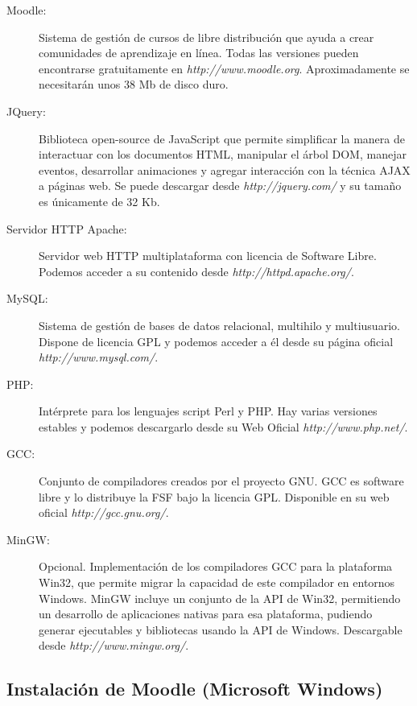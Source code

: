\begin{description}
	
	\item[Moodle:] Sistema de gestión de cursos de libre distribución que ayuda a crear comunidades de aprendizaje en línea. Todas las versiones pueden encontrarse gratuitamente en \emph{http://www.moodle.org}. Aproximadamente se necesitarán unos 38 Mb de disco duro.
	
	\item[JQuery:] Biblioteca open-source de JavaScript que permite simplificar la manera de interactuar con los documentos HTML, manipular el árbol DOM, manejar eventos, desarrollar animaciones y agregar interacción con la técnica AJAX a páginas web. Se puede descargar desde \emph{http://jquery.com/} y su tamaño es únicamente de 32 Kb.
	
	\item[Servidor HTTP Apache:] Servidor web HTTP multiplataforma con licencia de Software Libre. Podemos acceder a su contenido desde \emph{http://httpd.apache.org/}.
	
	\item[MySQL:] Sistema de gestión de bases de datos relacional, multihilo y multiusuario. Dispone de licencia GPL y podemos acceder a él desde su página oficial \emph{http://www.mysql.com/}.
	
	\item[PHP:] Intérprete para los lenguajes script Perl y PHP. Hay varias versiones estables y podemos descargarlo desde su Web Oficial \emph{http://www.php.net/}.
	
	\item[GCC:] Conjunto de compiladores creados por el proyecto GNU. GCC es software libre y lo distribuye la FSF bajo la licencia GPL. Disponible en su web oficial \emph{http://gcc.gnu.org/}.
	
	\item[MinGW:] Opcional. Implementación de los compiladores GCC para la plataforma Win32, que permite migrar la capacidad de este compilador en entornos Windows. MinGW incluye un conjunto de la API de Win32, permitiendo un desarrollo de aplicaciones nativas para esa plataforma, pudiendo generar ejecutables y bibliotecas usando la API de Windows. Descargable desde \emph{http://www.mingw.org/}.
	
\end{description}

\subsection{Instalación de Moodle (Microsoft Windows)}


